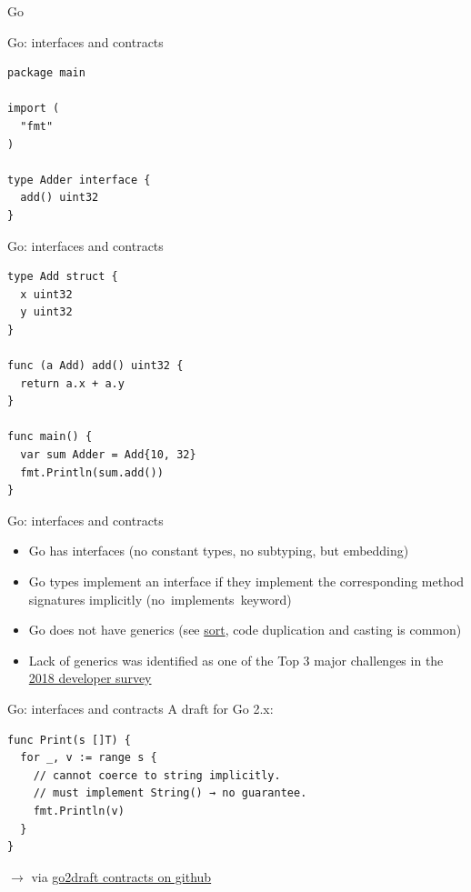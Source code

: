 \documentclass{beamer}
\newcommand\code[1]{\,{\color[HTML]{884400}#1}\,}
\newcommand\source[1]{$\rightarrow$ via #1}
\begin{document}
\begin{frame}[standout]
  Go
\end{frame}

\begin{frame}[fragile]{Go: interfaces and contracts}
  \begin{verbatim}
package main

import (
  "fmt"
)

type Adder interface {
  add() uint32
}
  \end{verbatim}
\end{frame}

\begin{frame}[fragile]{Go: interfaces and contracts}
  \begin{verbatim}
type Add struct {
  x uint32
  y uint32
}

func (a Add) add() uint32 {
  return a.x + a.y
}

func main() {
  var sum Adder = Add{10, 32}
  fmt.Println(sum.add())
}
  \end{verbatim}
\end{frame}

\begin{frame}[fragile]{Go: interfaces and contracts}
  \begin{itemize}
    \item Go has interfaces (no constant types, no subtyping, but embedding)
    \item Go types implement an interface if they implement the corresponding method signatures implicitly (no \code{implements} keyword)
    \item Go does not have generics (see \href{https://golang.org/pkg/sort/}{sort}, code duplication and casting is common)
    \item Lack of generics was identified as one of the Top 3 major challenges in the \href{https://blog.golang.org/survey2018-results}{2018 developer survey}
  \end{itemize}
\end{frame}

\begin{frame}[fragile]{Go: interfaces and contracts}
  A draft for Go 2.x:

  \begin{verbatim}
func Print(s []T) {
  for _, v := range s {
    // cannot coerce to string implicitly.
    // must implement String() → no guarantee.
    fmt.Println(v)
  }
}
  \end{verbatim}

  \source{\href{https://github.com/golang/proposal/blob/master/design/go2draft-contracts.md}{go2draft contracts on github}}
\end{frame}
\end{document}

